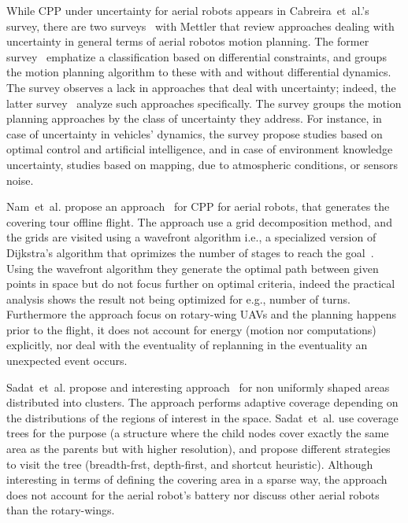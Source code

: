 While CPP under uncertainty for aerial robots appears in Cabreira~et~al.'s survey, there are two surveys~\citep{goerzen2010survey,dadkhah2012survey} with Mettler that review approaches dealing with uncertainty in general terms of aerial robotos motion planning. 
The former survey~\citep{goerzen2010survey} emphatize a classification based on differential constraints, and groups the motion planning algorithm to these with and without differential dynamics. The survey observes a lack in approaches that deal with uncertainty; indeed, the latter survey~\citep{dadkhah2012survey} analyze such approaches specifically. The survey groups the motion planning approaches by the class of uncertainty they address. For instance, in case of uncertainty in vehicles' dynamics, the survey propose studies based on optimal control and artificial intelligence, and in case of environment knowledge uncertainty, studies based on mapping, due to atmospheric conditions, or sensors noise. 

Nam~et~al. propose an approach~\citep{nam2016approach} for CPP for aerial robots, that generates the covering tour offline flight. The approach use a grid decomposition method, and the grids are visited using a wavefront algorithm i.e., a specialized version of Dijkstra's algorithm that oprimizes the number of stages to reach the goal~\citep{lavalle2006planning}. Using the wavefront algorithm they generate the optimal path between given points in space but do not focus further on optimal criteria, indeed the practical analysis shows the result not being optimized for e.g., number of turns. Furthermore the approach focus on rotary-wing UAVs and the planning happens prior to the flight, it does not account for energy (motion nor computations) explicitly, nor deal with the eventuality of replanning in the eventuality an unexpected event occurs.


Sadat~et~al. propose and interesting approach~\citep{sadat2014recursive} for non uniformly shaped areas distributed into clusters. The approach performs adaptive coverage depending on the distributions of the regions of interest in the space. Sadat~et~al. use coverage trees for the purpose (a structure where the child nodes cover exactly the same area as the parents but with higher resolution), and propose different strategies to visit the tree (breadth-frst, depth-first, and shortcut heuristic). Although interesting in terms of defining the covering area in a sparse way, the approach does not account for the aerial robot's battery nor discuss other aerial robots than the rotary-wings.




